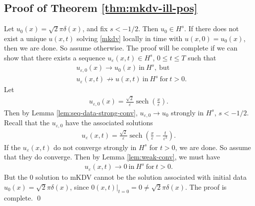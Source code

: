 \documentclass[12pt,reqno]{amsart}
\numberwithin{equation}{section}  %
\newcommand{\ee}{\varepsilon}
\DeclareMathOperator{\sech}{sech}
\begin{document}
        \subsection{Proof of Theorem \ref{thm:mkdv-ill-pos}} 
        \label{ssec:pf-thm}
        Let $u_{0}(x) = \sqrt{2} \pi \delta(x)$, and fix $s < -1/2$.
        Then $u_{0} \in H^{s}$. If there does not exist a unique $u(x,t)$
        solving \eqref{mkdv} locally in time with $u(x, 0) = u_{0}(x)$, then we
        are done. So assume otherwise. The proof will be complete if we can show
        that there exists a sequence $u_{\ee}(x,t) \in H^{s}$, $0 \le t \le T$
        such that
        \begin{equation*}
        \begin{split}
          & u_{\ee, 0}(x) \to u_{0}(x) \ \text{in} \ H^{s}, \ \text{but}
          \\
          & u_{\ee}(x,t) \not \to u(x,t) \ \text{in} \ H^{s} \ \text{for} \ t>0.
        \end{split}
        \end{equation*}
        Let 
        \begin{equation*}
        \begin{split}
          u_{\ee, 0}(x) = \frac{\sqrt{2}}{\ee} \sech\left( \frac{x}{\ee}
          \right). 
        \end{split}
        \end{equation*}
        Then by Lemma \ref{lem:seq-data-strong-conv}, $u_{\ee, 0} \to
        u_{0}$ strongly in $H^{s}$, $s < -1/2$. Recall that the $u_{\ee, 0}$ have
        the associated solutions
        \begin{equation*}
        \begin{split}
          u_{\ee}(x,t) = \frac{\sqrt{2}}{\ee} \sech\left( \frac{x}{ \ee} -
          \frac{t}{ \ee^{3}} \right).
        \end{split}
        \end{equation*}
        If the $u_{\ee}(x,t)$ do not converge strongly in $H^{s}$ for $t > 0$, we
        are done. So assume that they do converge. Then by Lemma
        \ref{lem:weak-conv}, we must have
        \begin{equation*}
        \begin{split}
          u_{\ee}(x,t) \to 0 \ \text{in} \ H^{s} \ \text{for} \ t > 0.
        \end{split}
        \end{equation*}
        But the $0$ solution to mKDV cannot be the solution associated with
        initial data $u_{0}(x) = \sqrt{2} \pi \delta(x)$, since $0(x,t)
        \vert_{t = 0} = 0 \neq \sqrt{2} \pi \delta(x)$. The proof is complete.
        \qed

        





        
\end{document}
